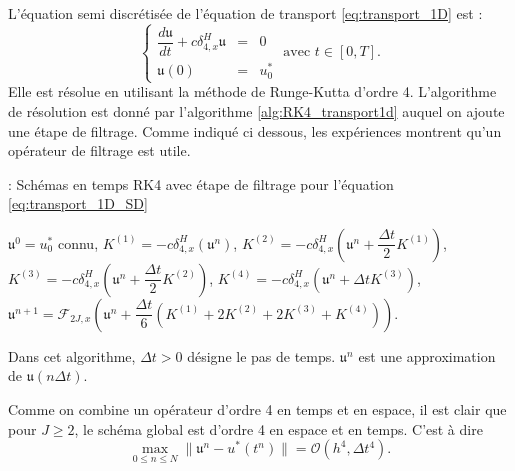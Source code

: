 L'équation semi discrétisée de l'équation de transport \eqref{eq:transport_1D} est :
\begin{equation}
\left\lbrace
\begin{array}{rcl}
\dfrac{d \mathfrak{u}}{dt} + c \delta_{4,x}^H \mathfrak{u}& = &0 \\
\mathfrak{u}(0) & = & u_0^*
\end{array}
\text{ avec } t \in [0,T].
\right.
\label{eq:transport_1D_SD}
\end{equation}
Elle est résolue en utilisant la méthode de Runge-Kutta d'ordre 4. L'algorithme de résolution est donné par l'algorithme \ref{alg:RK4_transport1d} auquel on ajoute une étape de filtrage. Comme indiqué ci dessous, les expériences montrent qu'un opérateur de filtrage \cite{Visbal2002} est utile.
\begin{center}
\begin{minipage}[H]{12cm}
  \begin{algorithm}[H]
    \caption{: Schémas en temps RK4 avec étape de filtrage pour l'équation \eqref{eq:transport_1D_SD}}\label{alg:RK4_transport1d}
    \begin{algorithmic}[1]
    \State $\mathfrak{u}^0 = u_0^*$ connu,
             \State  $K^{(1)} = - c \delta_{4,x}^H \left( \mathfrak{u}^n \right)$,
             \State  $K^{(2)} = - c \delta_{4,x}^H \left( \mathfrak{u}^n + \dfrac{\Delta t}{2} K^{(1)}\right)$,
             \State  $K^{(3)} = - c \delta_{4,x}^H \left( \mathfrak{u}^n + \dfrac{\Delta t}{2} K^{(2)}\right)$,
             \State  $K^{(4)} = - c \delta_{4,x}^H \left( \mathfrak{u}^n + \Delta t K^{(3)}\right)$,  
             \State  $\mathfrak{u}^{n+1} = \mathcal{F}_{2J,x}\left( \mathfrak{u}^n  + \dfrac{\Delta t}{6} \left( K^{(1)} + 2 K^{(2)} + 2 K^{(3)} + K^{(4)} \right) \right)$.
            \EndFor
    \end{algorithmic}
    \end{algorithm}
\end{minipage}
\end{center}
Dans cet algorithme, $\Delta t > 0$ désigne le pas de temps. $\mathfrak{u}^n$ est une approximation de $\mathfrak{u}(n \Delta t)$.

Comme on combine un opérateur d'ordre 4 en temps et en espace, il est clair que pour $J \geq 2$, le schéma global est d'ordre 4 en espace et en temps. C'est à dire
\begin{equation}
\max_{0 \leq n \leq N} \| \mathfrak{u}^n - u^*(t^n) \| = \mathcal{O} \left( h^4 , \Delta t^4 \right).
\end{equation}




